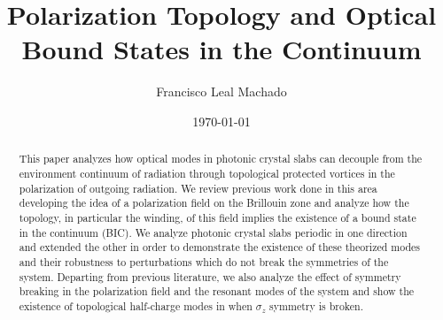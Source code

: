 \usepackage{graphicx}      %
\usepackage{bm}            %
\usepackage[colorlinks=true]{hyperref}  %




\title{Polarization Topology and Optical Bound States in the Continuum}
\author{Francisco Leal Machado}
\date{\today}


\begin{abstract}
This paper analyzes how optical modes in photonic crystal slabs can decouple from the environment continuum of radiation through topological protected vortices in the polarization of outgoing radiation. We review previous work done in this area \cite{Zhen2014, hSU2013} developing the idea of a polarization field on the Brillouin zone and analyze how the topology, in particular the winding, of this field implies the existence of a bound state in the continuum (BIC).  We analyze photonic crystal slabs periodic in one direction and extended the other in order to demonstrate the existence of these theorized modes and their robustness to perturbations which do not break the symmetries of the system. Departing from previous literature, we also analyze the effect of symmetry breaking in the polarization field and the resonant modes of the system and show the existence of topological half-charge modes in when $\sigma_z$ symmetry is broken.
\end{abstract}

\maketitle

